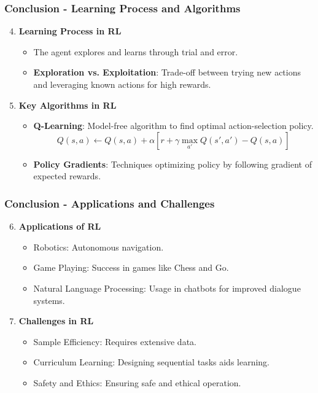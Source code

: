 \documentclass[aspectratio=169]{beamer}
\begin{document}
\begin{frame}[fragile]
    \frametitle{Conclusion - Learning Process and Algorithms}
    \begin{enumerate}
        \setcounter{enumi}{3}
        \item \textbf{Learning Process in RL}
        \begin{itemize}
            \item The agent explores and learns through trial and error.
            \item \textbf{Exploration vs. Exploitation}: Trade-off between trying new actions and leveraging known actions for high rewards.
        \end{itemize}

        \item \textbf{Key Algorithms in RL}
        \begin{itemize}
            \item \textbf{Q-Learning}: Model-free algorithm to find optimal action-selection policy.
            \begin{equation} 
                Q(s, a) \leftarrow Q(s, a) + \alpha \left[ r + \gamma \max_{a'} Q(s', a') - Q(s, a) \right]
            \end{equation}
            \item \textbf{Policy Gradients}: Techniques optimizing policy by following gradient of expected rewards.
        \end{itemize}
    \end{enumerate}
\end{frame}

\begin{frame}[fragile]
    \frametitle{Conclusion - Applications and Challenges}
    \begin{enumerate}
        \setcounter{enumi}{5}
        \item \textbf{Applications of RL}
        \begin{itemize}
            \item Robotics: Autonomous navigation.
            \item Game Playing: Success in games like Chess and Go.
            \item Natural Language Processing: Usage in chatbots for improved dialogue systems.
        \end{itemize}

        \item \textbf{Challenges in RL}
        \begin{itemize}
            \item Sample Efficiency: Requires extensive data.
            \item Curriculum Learning: Designing sequential tasks aids learning.
            \item Safety and Ethics: Ensuring safe and ethical operation.
        \end{itemize}
    \end{enumerate}
\end{frame}
\end{document}
